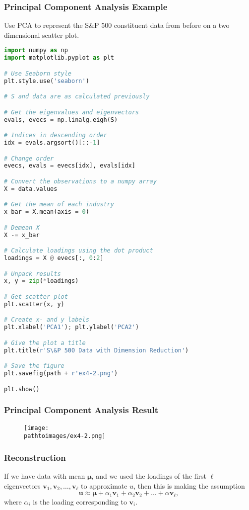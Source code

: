 \documentclass{beamer}
\newcommand{\pathtoimages}{/Users/charlesrambo/Desktop/Bootcamp24/Images}
\begin{document}
\begin{frame}[fragile]
\frametitle{Principal Component Analysis Example}
\begin{Example}
Use PCA to represent the S\&P 500 constituent data from before on a two dimensional scatter plot.
\end{Example}
\begin{multicols}{2}
\begin{lstlisting}[language=Python]
import numpy as np
import matplotlib.pyplot as plt

# Use Seaborn style
plt.style.use('seaborn')

# S and data are as calculated previously

# Get the eigenvalues and eigenvectors
evals, evecs = np.linalg.eigh(S)

# Indices in descending order
idx = evals.argsort()[::-1]

# Change order
evecs, evals = evecs[idx], evals[idx]

# Convert the observations to a numpy array
X = data.values

# Get the mean of each industry
x_bar = X.mean(axis = 0)

# Demean X
X -= x_bar

# Calculate loadings using the dot product
loadings = X @ evecs[:, 0:2]

# Unpack results
x, y = zip(*loadings)

# Get scatter plot
plt.scatter(x, y)

# Create x- and y labels
plt.xlabel('PCA1'); plt.ylabel('PCA2')

# Give the plot a title
plt.title(r'S\&P 500 Data with Dimension Reduction')

# Save the figure
plt.savefig(path + r'ex4-2.png')

plt.show()
\end{lstlisting}
\end{multicols}
\end{frame}

\begin{frame}
\frametitle{Principal Component Analysis Result}
\begin{figure}
\centering
\texttt{[image: \\pathtoimages/ex4-2.png]}
\end{figure}

\end{frame}

\begin{frame}
\frametitle{Reconstruction}
If we have data with mean $ {\boldsymbol \mu}$, and we used the loadings of the first $\ell$ eigenvectors ${\boldsymbol v_1}, {\boldsymbol v_2},\ldots, {\boldsymbol v_\ell}$ to approximate $u$, then this is making the assumption
$$
{\boldsymbol u} \approx  {\boldsymbol \mu} + \alpha_1 {\boldsymbol v_1} + \alpha_2 {\boldsymbol v_2}+\ldots + \alpha {\boldsymbol v_\ell},
$$
where $\alpha_i$ is the loading corresponding to ${\boldsymbol v_i}$. 

\end{frame}
\end{document}
